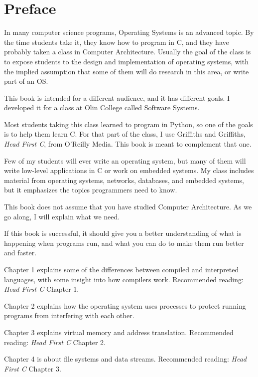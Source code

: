 \documentclass[12pt]{book}
\begin{document}
\fi

\chapter{Preface}
\label{preface}

In many computer science programs, Operating Systems is an advanced
topic.  By the time students take it, they know how to program
in C, and they have probably taken a class in Computer Architecture.
Usually the goal of the class is to expose students to the design
and implementation of operating systems, with the implied assumption
that some of them will do research in this area, or write part of
an OS.

This book is intended for a different audience, and it has different
goals.  I developed it for a class at Olin College called Software
Systems.

Most students taking this class learned to program in Python,
so one of the goals is to help them learn C.
For that part of the class, I use Griffiths and Griffiths, {\it Head
  First C}, from O'Reilly Media.  This book is meant to complement
that one.

Few of my students will ever write an operating system, but many of
them will write low-level applications in C or work on embedded
systems.  My class includes material from operating systems, networks,
databases, and embedded systems, but it emphasizes the topics
programmers need to know.

This book does not assume that you have studied Computer Architecture.
As we go along, I will explain what we need.

If this book is successful, it should give you a better understanding
of what is happening when programs run, and what you can do to make
them run better and faster.

Chapter 1 explains some of the differences between compiled and
interpreted languages, with some insight into how compilers work.
Recommended reading: {\it Head First C} Chapter 1.

Chapter 2 explains how the operating system uses processes to
protect running programs from interfering with each other.

Chapter 3 explains virtual memory and address translation.
Recommended reading: {\it Head First C} Chapter 2.

Chapter 4 is about file systems and data streams.
Recommended reading: {\it Head First C} Chapter 3.
\end{document}
